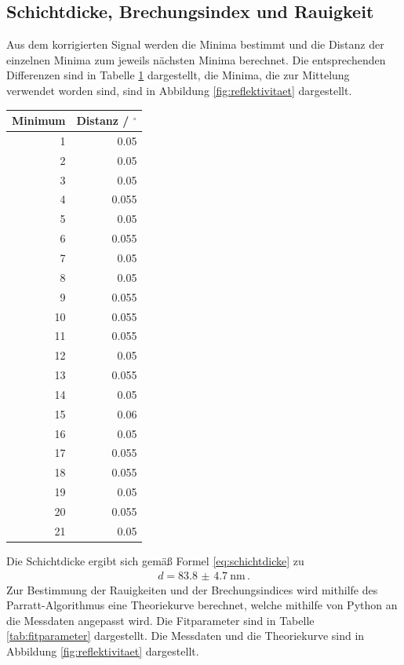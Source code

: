 \documentclass[captions=tableheading]{scrartcl}
\begin{document}
\subsection{Schichtdicke, Brechungsindex und Rauigkeit}
Aus dem korrigierten Signal werden die Minima bestimmt und die Distanz der einzelnen Minima zum jeweils nächsten Minima berechnet. Die entsprechenden Differenzen sind in Tabelle \ref{tab:minima} dargestellt, die Minima, die zur Mittelung verwendet worden sind, sind in Abbildung \ref{fig:reflektivitaet} dargestellt. \\
\begin{table}[H]
	\centering
	\label{tab:minima}
	\begin{tabular}{r r}
		\toprule
		Minimum & Distanz / $^\circ$ \\
		\midrule
		1 & 0.05 \\
		2 & 0.05 \\
		3 & 0.05 \\
		4 & 0.055 \\
		5 & 0.05 \\
		6 & 0.055 \\
		7 & 0.05 \\
		8 & 0.05 \\
		9 & 0.055 \\
		10 & 0.055 \\
		11 & 0.055 \\
		12 & 0.05 \\
		13 & 0.055 \\
		14 & 0.05 \\
		15 & 0.06 \\
		16 & 0.05 \\
		17 & 0.055 \\
		18 & 0.055 \\
		19 & 0.05 \\
		20 & 0.055 \\
		21 & 0.05 \\
		\bottomrule
	\end{tabular}
\end{table}
Die Schichtdicke ergibt sich gemäß Formel \ref{eq:schichtdicke} zu
\begin{align*}
d=\SI{83.8(47)}{\nano \metre}\,.
\end{align*}
Zur Bestimmung der Rauigkeiten und der Brechungsindices wird mithilfe des Parratt-Algorithmus eine Theoriekurve berechnet, welche mithilfe von Python an die Messdaten angepasst wird. Die Fitparameter sind in Tabelle \ref{tab:fitparameter} dargestellt. Die Messdaten und die Theoriekurve sind in Abbildung \ref{fig:reflektivitaet} dargestellt.
\end{document}
